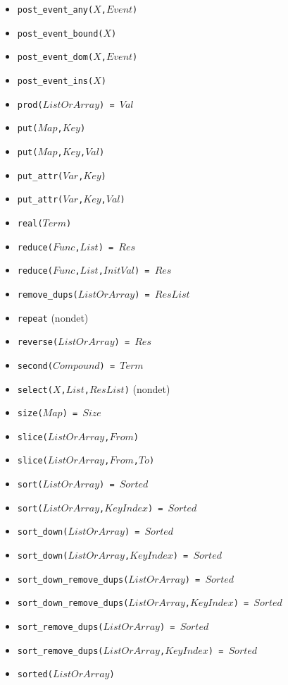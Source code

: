 \documentclass[10pt]{article}
\begin{document}
\begin{multicols}{2}
\begin{scriptsize}
\begin{itemize}
    \item \texttt{post\_event\_any($X$,$Event$)}
    \item \texttt{post\_event\_bound($X$)}
    \item \texttt{post\_event\_dom($X$,$Event$)}
    \item \texttt{post\_event\_ins($X$)}
    \item \texttt{prod($ListOrArray$) = $Val$}
    \item \texttt{put($Map$,$Key$)} 
    \item \texttt{put($Map$,$Key$,$Val$)} 
    \item \texttt{put\_attr($Var$,$Key$)} 
    \item \texttt{put\_attr($Var$,$Key$,$Val$)} 
    \item \texttt{real($Term$)} 
    \item \texttt{reduce($Func$,$List$) = $Res$} 
    \item \texttt{reduce($Func$,$List$,$InitVal$) = $Res$} 
    \item \texttt{remove\_dups($ListOrArray$) = $ResList$} 
    \item \texttt{repeat} (nondet)
    \item \texttt{reverse($ListOrArray$) = $Res$} 
    \item \texttt{second($Compound$) = $Term$} 
    \item \texttt{select($X$,$List$,$ResList$)} (nondet)
    \item \texttt{size($Map$) = $Size$}
    \item \texttt{slice($ListOrArray$,$From$)}
    \item \texttt{slice($ListOrArray$,$From$,$To$)}
    \item \texttt{sort($ListOrArray$) = $Sorted$} 
    \item \texttt{sort($ListOrArray$,$KeyIndex$) = $Sorted$} 
    \item \texttt{sort\_down($ListOrArray$) = $Sorted$} 
    \item \texttt{sort\_down($ListOrArray$,$KeyIndex$) = $Sorted$} 
    \item \texttt{sort\_down\_remove\_dups($ListOrArray$) = $Sorted$} 
    \item \texttt{sort\_down\_remove\_dups($ListOrArray$,$KeyIndex$) = $Sorted$} 
    \item \texttt{sort\_remove\_dups($ListOrArray$) = $Sorted$} 
    \item \texttt{sort\_remove\_dups($ListOrArray$,$KeyIndex$) = $Sorted$} 
    \item \texttt{sorted($ListOrArray$)} 

\end{itemize}
\end{scriptsize}
\end{multicols}
\end{document}
